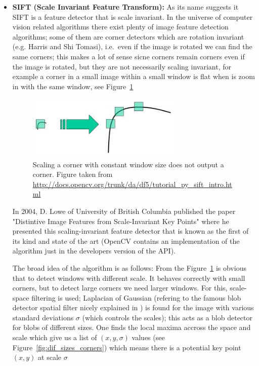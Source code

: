 \begin{itemize}
\item \textbf{SIFT (Scale Invariant Feature Transform):} As its name suggests it SIFT is a feature detector that is scale invariant. In the universe of computer vision related algorithms there exist plenty of image feature detection algorithms; some of them are corner detectors which are rotation invariant (e.g. Harris and Shi Tomasi), i.e.\ even if the image is rotated we can find the same corners; this makes a lot of sense sicne corners remain corners even if the image is rotated, but they are not necessarily scaling invariant, for example a corner in a small image within a small window is flat when is zoom in with the same window, see Figure~\ref{fig:ScalingCorner}

\begin{figure}[h!]
\centering
\includegraphics[width=0.7\textwidth]{./Diagrams/ScalingCorner.jpg}
\caption{Scaling a corner with constant window size does not output a corner. Figure taken from \url{http://docs.opencv.org/trunk/da/df5/tutorial_py_sift_intro.html}}
\label{fig:ScalingCorner}
\end{figure}

In 2004, D. Lowe of University of British Columbia published the paper "Distintive Image Features from Scale-Invariant Key Points" \cite{SIFT} where he presented this scaling-invariant feature detector that is known as the first of its kind and state of the art (OpenCV contains an implementation of the algorithm just in the developers version of the API). 

\bigskip

The broad idea of the algorithm is as follows: From the Figure~\ref{fig:ScalingCorner} is obvious that to detect windows with different scale. It behaves correctly with small corners, but to detect large corners we need larger windows. For this, scale-space filtering is used; Laplacian of Gaussian (refering to the famous blob detector spatial filter nicely explained in \cite{MVision}) is found for the image with various standard deviations $\sigma$ (which controls the scales); this acts as a blob detector for blobs of different sizes. One finds the local maxima accross the space and scale which give us a list of $(x,y,\sigma)$ values (see Figure~\ref{fig:dif_sizes_corners}) which means there is a potential key point $(x,y)$ at scale $\sigma$


\end{itemize}
